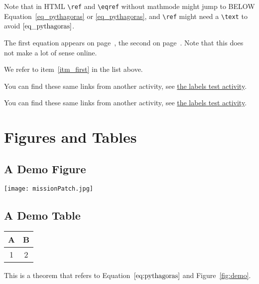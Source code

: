 \documentclass{ximera}
\begin{document}
Note that in HTML \verb|\ref| and \verb|\eqref| without mathmode might jump to BELOW Equation~\ref{eq_pythagoras} or \eqref{eq_pythagoras}, and
\verb|\ref| might need a \verb|\text| to avoid $\ref{eq_pythagoras}$.

The first equation appears on page~\pageref{eq_pythagoras}, the second on page~\pageref{eq_tag_pythagoras}. 
Note that this does not make a lot of sense online.

We refer to item~\ref{itm_first} in the list above.

You can find these same links from another activity, see \hyperlink{xim_labelsFromOtherActivity}{the labels test activity}.

You can find these same links from another activity, see \hyperref[xim_labelsFromOtherActivity]{the labels test activity}.

\section{Figures and Tables}

\subsection{A Demo Figure}
\label{sec:fig}

\begin{image}[0.3\textwidth]
  \centering
  \texttt{[image: missionPatch.jpg]} %
\end{image}
  \label{fig:demo}

\subsection{A Demo Table}

{
  \centering
  \begin{tabular}{|c|c|}
    \hline
    A & B \\
    \hline
    1 & 2 \\
    \hline
  \end{tabular}
  \label{tab:example}
}

 \begin{theorem} \label{thm:1}
  
  This is a theorem that refers to Equation~$\eqref{eq:pythagoras}$ and Figure~\ref{fig:demo}.

  
 \end{theorem}
\end{document}

